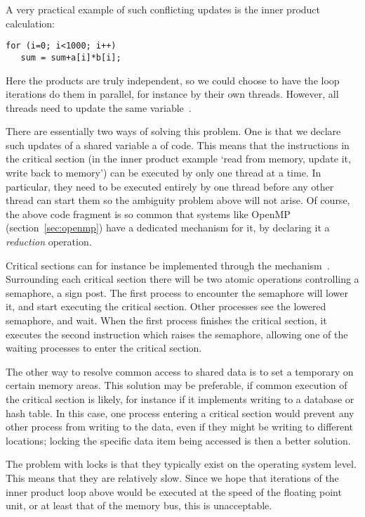 A very practical example of such conflicting updates is the inner
product calculation:
\begin{verbatim}
for (i=0; i<1000; i++)
   sum = sum+a[i]*b[i];
\end{verbatim}
Here the products are truly independent, so we could choose to have
the loop iterations do them in parallel, for instance by their own
threads. However, all threads need to update the same variable~.

There are essentially two ways of solving this problem. 
One is that we declare such updates of a shared variable a
 of code. This means that the instructions
in the critical section (in the inner product example `read 
from memory, update it, write back to memory') can be executed by only
one thread at a time. In particular, they need to be executed
entirely by one thread before any other thread can start them so the
ambiguity problem above will not arise. Of course, the above code
fragment is so common that systems like OpenMP
(section~\ref{sec:openmp}) have a dedicated mechanism for it, by
declaring it a \emph{reduction}
operation.

Critical sections can for instance be implemented through the 
mechanism~\cite{Dijkstra:semaphores}. Surrounding each critical
section there will be two atomic operations controlling a semaphore, a
sign post.
The first process to encounter the semaphore will lower it, and start
executing the critical section. Other processes see the lowered
semaphore, and wait. When the first process finishes the critical
section, it executes the second instruction which raises the
semaphore, allowing one of the waiting processes to enter the critical
section.

The other way to resolve common access to shared data is to set a 
temporary  on certain memory areas. This solution may
be preferable, if common execution of the critical section is likely,
for instance if it implements writing to a database or hash table. In
this case, one process entering a
critical section would prevent any other process from writing
to the data, even if they might be writing to different locations;
locking the specific data item being accessed is then a better
solution.

The problem with locks is that they typically exist on the operating
system level. This means that they are relatively slow. Since we hope that
iterations of the inner product loop above would be executed at the
speed of the floating point unit, or at least that of the memory bus,
this is unacceptable.

